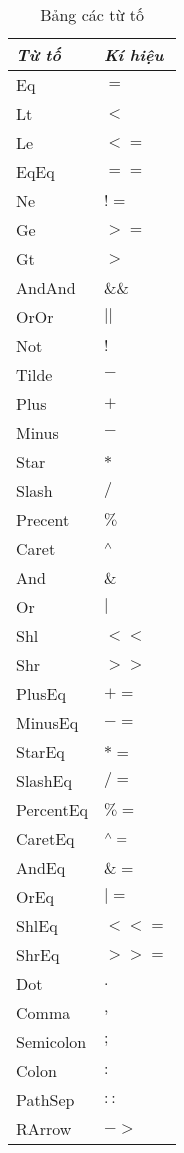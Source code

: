 \begin{longtable}{|p{4cm}| l |}
    \caption{Bảng các từ tố} \\
\hline
\textbf{\textit{Từ tố}} & \textbf{\textit{Kí hiệu}} \\
\hline
Eq & $=$ \\
\hline
Lt & $<$ \\
\hline
Le & $<=$ \\
\hline
EqEq & $==$ \\
\hline
Ne & $!=$ \\
\hline
Ge & $>=$ \\
\hline
Gt & $>$ \\
\hline
AndAnd & $\&\&$ \\
\hline
OrOr & $||$ \\
\hline
Not & $!$ \\
\hline
Tilde & $-$ \\
\hline
Plus & $+$ \\
\hline
Minus & $-$ \\
\hline
Star & $*$ \\
\hline
Slash & $/$ \\
\hline
Precent & $\%$ \\
\hline
Caret & $\textsuperscript{$\wedge$}$ \\
\hline
And & $\&$ \\
\hline
Or & $|$ \\
\hline
Shl & $<<$ \\
\hline
Shr & $>>$ \\
\hline
PlusEq & $+=$ \\
\hline
MinusEq & $-=$ \\
\hline
StarEq & $*=$ \\
\hline
SlashEq & $/=$ \\
\hline
PercentEq & $\%=$ \\
\hline
CaretEq & $\textsuperscript{$\wedge$}=$ \\
\hline
AndEq & $\&=$ \\
\hline
OrEq & $|=$ \\
\hline
ShlEq & $<<=$ \\
\hline
ShrEq & $>>=$ \\
\hline
Dot & $.$ \\
\hline
Comma & $,$ \\
\hline
Semicolon & $;$ \\
\hline
Colon & $:$ \\
\hline
PathSep & $::$ \\
\hline
RArrow & $->$ \\

\end{longtable}
